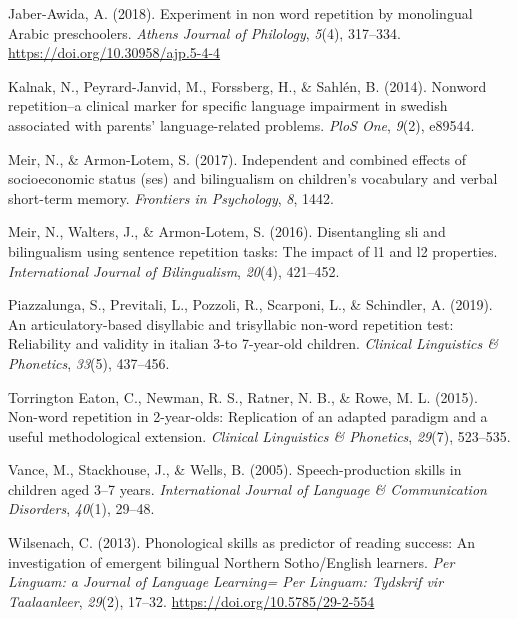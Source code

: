 \documentclass[english,,man]{apa6}
\begin{document}
\leavevmode\hypertarget{ref-jabere2018xperiment}{}%
Jaber-Awida, A. (2018). Experiment in non word repetition by monolingual Arabic preschoolers. \emph{Athens Journal of Philology}, \emph{5}(4), 317--334. \url{https://doi.org/10.30958/ajp.5-4-4}

\leavevmode\hypertarget{ref-kalnak2014nonword}{}%
Kalnak, N., Peyrard-Janvid, M., Forssberg, H., \& Sahlén, B. (2014). Nonword repetition--a clinical marker for specific language impairment in swedish associated with parents' language-related problems. \emph{PloS One}, \emph{9}(2), e89544.

\leavevmode\hypertarget{ref-meir2017independent}{}%
Meir, N., \& Armon-Lotem, S. (2017). Independent and combined effects of socioeconomic status (ses) and bilingualism on children's vocabulary and verbal short-term memory. \emph{Frontiers in Psychology}, \emph{8}, 1442.

\leavevmode\hypertarget{ref-meir2016disentangling}{}%
Meir, N., Walters, J., \& Armon-Lotem, S. (2016). Disentangling sli and bilingualism using sentence repetition tasks: The impact of l1 and l2 properties. \emph{International Journal of Bilingualism}, \emph{20}(4), 421--452.

\leavevmode\hypertarget{ref-piazzalunga2019articulatory}{}%
Piazzalunga, S., Previtali, L., Pozzoli, R., Scarponi, L., \& Schindler, A. (2019). An articulatory-based disyllabic and trisyllabic non-word repetition test: Reliability and validity in italian 3-to 7-year-old children. \emph{Clinical Linguistics \& Phonetics}, \emph{33}(5), 437--456.

\leavevmode\hypertarget{ref-torrington2015non}{}%
Torrington Eaton, C., Newman, R. S., Ratner, N. B., \& Rowe, M. L. (2015). Non-word repetition in 2-year-olds: Replication of an adapted paradigm and a useful methodological extension. \emph{Clinical Linguistics \& Phonetics}, \emph{29}(7), 523--535.

\leavevmode\hypertarget{ref-vance2005speech}{}%
Vance, M., Stackhouse, J., \& Wells, B. (2005). Speech-production skills in children aged 3--7 years. \emph{International Journal of Language \& Communication Disorders}, \emph{40}(1), 29--48.

\leavevmode\hypertarget{ref-wilsenach2013phonological}{}%
Wilsenach, C. (2013). Phonological skills as predictor of reading success: An investigation of emergent bilingual Northern Sotho/English learners. \emph{Per Linguam: a Journal of Language Learning= Per Linguam: Tydskrif vir Taalaanleer}, \emph{29}(2), 17--32. \url{https://doi.org/10.5785/29-2-554}
\end{document}
